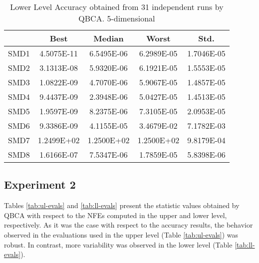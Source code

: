 \documentclass[conference]{IEEEtran}
\theoremstyle{definition}
\begin{document}
\begin{table}[htbp]
    \caption{Lower Level Accuracy obtained from 31 independent runs by QBCA. 5-dimensional}
    \label{tab:ll-accur-5}
    \centering
    \begin{tabular}{ccccc}
        \hline
             & Best &  Median  &  Worst &  Std. \\ \hline
        SMD1 & 4.5075E-11 & 6.5495E-06 & 6.2989E-05 & 1.7046E-05 \\ \hline 
        SMD2 & 3.1313E-08 & 5.9320E-06 & 6.1921E-05 & 1.5553E-05 \\ \hline 
        SMD3 & 1.0822E-09 & 4.7070E-06 & 5.9067E-05 & 1.4857E-05 \\ \hline 
        SMD4 & 9.4437E-09 & 2.3948E-06 & 5.0427E-05 & 1.4513E-05 \\ \hline 
        SMD5 & 1.9597E-09 & 8.2375E-06 & 7.3105E-05 & 2.0953E-05 \\ \hline 
        SMD6 & 9.3386E-09 & 4.1155E-05 & 3.4679E-02 & 7.1782E-03 \\ \hline 
        SMD7 & 1.2499E+02 & 1.2500E+02 & 1.2500E+02 & 9.8179E-04 \\ \hline 
        SMD8 & 1.6166E-07 & 7.5347E-06 & 1.7859E-05 & 5.8398E-06 \\ \hline 

    \end{tabular}
\end{table}

\subsection{Experiment 2}
Tables \ref{tab:ul-evals} and \ref{tab:ll-evals} present the statistic values
obtained by QBCA with respect to the NFEs computed in the upper and lower level,
respectively. As it was the case with respect to the accuracy results, the behavior
observed in the evaluations used in the upper level (Table \ref{tab:ul-evals})
was robust. In contrast, more variability was observed in the lower level
(Table \ref{tab:ll-evals}). 
\end{document}
